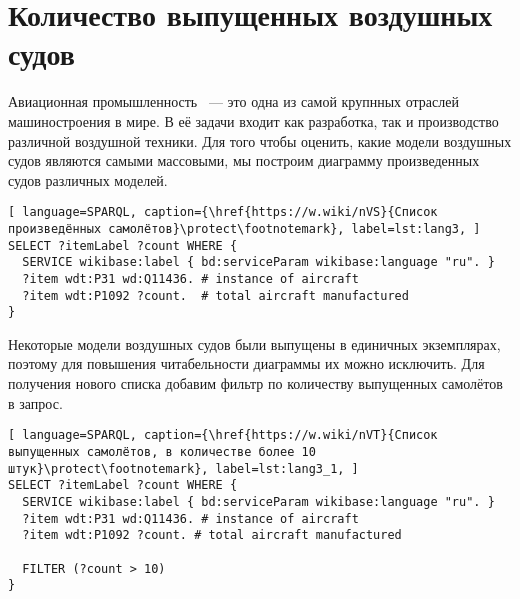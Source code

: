 \section{Количество выпущенных воздушных судов}

Авиационная промышленность ~--- это одна из самой крупнных отраслей машиностроения в мире. 
В её задачи входит как разработка, так и производство различной воздушной техники. 
Для того чтобы оценить, какие модели воздушных судов являются самыми массовыми, 
мы построим диаграмму произведенных судов различных моделей.

\begin{lstlisting}[ language=SPARQL, caption={\href{https://w.wiki/nVS}{Список произведённых самолётов}\protect\footnotemark}, label=lst:lang3, ]
SELECT ?itemLabel ?count WHERE {
  SERVICE wikibase:label { bd:serviceParam wikibase:language "ru". }
  ?item wdt:P31 wd:Q11436. # instance of aircraft
  ?item wdt:P1092 ?count.  # total aircraft manufactured
}
\end{lstlisting}


Некоторые модели воздушных судов были выпущены в единичных экземплярах, поэтому для повышения читабельности диаграммы их можно исключить. Для получения нового списка добавим фильтр по количеству выпущенных самолётов в запрос.

\begin{lstlisting}[ language=SPARQL, caption={\href{https://w.wiki/nVT}{Список выпущенных самолётов, в количестве более 10 штук}\protect\footnotemark}, label=lst:lang3_1, ]
SELECT ?itemLabel ?count WHERE {
  SERVICE wikibase:label { bd:serviceParam wikibase:language "ru". }
  ?item wdt:P31 wd:Q11436. # instance of aircraft
  ?item wdt:P1092 ?count. # total aircraft manufactured
  
  FILTER (?count > 10)
}
\end{lstlisting}


